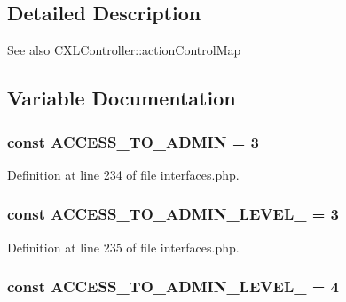 \subsection{Detailed Description}
\begin{DoxySeeAlso}{See also}
CXLController::actionControlMap 
\end{DoxySeeAlso}


\subsection{Variable Documentation}
\hypertarget{group__constants__acl__indices_ga16a362e48c9f7e6757bb15e0a3d9fa4f}{
\subsubsection[{ACCESS\_\-TO\_\-ADMIN}]{\setlength{\rightskip}{0pt plus 5cm}const ACCESS\_\-TO\_\-ADMIN = 3}}
\label{group__constants__acl__indices_ga16a362e48c9f7e6757bb15e0a3d9fa4f}


Definition at line 234 of file interfaces.php.

\hypertarget{group__constants__acl__indices_ga6a8da045f81793625a0cb332106e71ba}{
\subsubsection[{ACCESS\_\-TO\_\-ADMIN\_\-LEVEL\_\-0}]{\setlength{\rightskip}{0pt plus 5cm}const ACCESS\_\-TO\_\-ADMIN\_\-LEVEL\_ = 3}}
\label{group__constants__acl__indices_ga6a8da045f81793625a0cb332106e71ba}


Definition at line 235 of file interfaces.php.

\hypertarget{group__constants__acl__indices_ga3b271ad21d11058b550be5ab9599cce3}{
\subsubsection[{ACCESS\_\-TO\_\-ADMIN\_\-LEVEL\_\-1}]{\setlength{\rightskip}{0pt plus 5cm}const ACCESS\_\-TO\_\-ADMIN\_\-LEVEL\_ = 4}}
\label{group__constants__acl__indices_ga3b271ad21d11058b550be5ab9599cce3}


